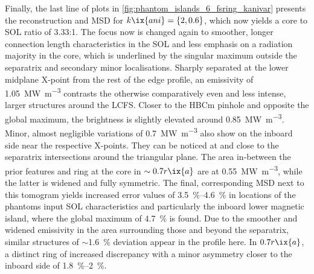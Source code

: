                 Finally, the last line of plots in \cref{fig:phantom_islands_6_fsring_kanivar} presents the reconstruction and MSD for $k\ix{ani}=\left\{2, 0.6\right\}$, which now yields a core to SOL ratio of 3.33:1. The focus now is changed again to smoother, longer connection length characteristics in the SOL and less emphasis on a radiation majority in the core, which is underlined by the singular maximum outside the separatrix and secondary minor localisations. Sharply separated at the lower midplane X-point from the rest of the edge profile, an emissivity of \SI{1.05}{\mega\watt\per\cubic\meter} contrasts the otherwise comparatively even and less intense, larger structures around the LCFS. Closer to the HBCm pinhole and opposite the global maximum, the brightness is slightly elevated around \SI{0.85}{\mega\watt\per\cubic\meter}. Minor, almost negligible variations of \SI{0.7}{\mega\watt\per\cubic\meter} also show on the inboard side near the respective X-points. They can be noticed at and close to the separatrix intersections around the triangular plane. The area in-between the prior features and ring at the core in $\sim0.7r\ix{a}$ are at \SI{0.55}{\mega\watt\per\cubic\meter}, while the latter is widened and fully symmetric. The final, corresponding MSD next to this tomogram yields increased error values of \SIrange{3.5}{4.6}{\percent} in locations of the phantoms input SOL characteristics and particularly the inboard lower magnetic island, where the global maximum of \SI{4.7}{\percent} is found. Due to the smoother and widened emissivity in the area surrounding those and beyond the separatrix, similar structures of $\sim$\SI{1.6}{\percent} deviation appear in the profile here. In $0.7r\ix{a}$, a distinct ring of increased discrepancy with a minor asymmetry closer to the inboard side of \SIrange{1.8}{2}{\percent}.\\%
